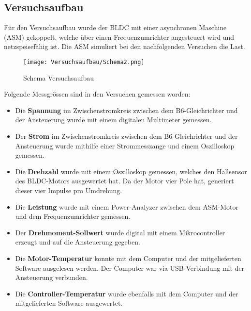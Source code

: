 \subsection{Versuchsaufbau}\label{subsec:Versuchsaufbau}
Für den Versuchsaufbau wurde der BLDC mit einer asynchronen Maschine (ASM) gekoppelt, welche über einen Frequenzumrichter angesteuert wird und netzspeisefähig ist. Die ASM simuliert bei den nachfolgenden Versuchen die Last.


\begin{figure}[H]
	\begin{center}
		\texttt{[image: Versuchsaufbau/Schema2.png]}
		\caption{Schema Versuchsaufbau}
		\label{fig:Schema}
	\end{center}
\end{figure}

Folgende Messgrössen sind in den Versuchen gemessen worden:
\begin{itemize}
	\item Die \textbf{Spannung} im Zwischenstromkreis zwischen dem B6-Gleichrichter und der Ansteuerung wurde mit einem digitalen Multimeter gemessen.
	\item Der \textbf{Strom} im Zwischenstromkreis zwischen dem B6-Gleichrichter und der Ansteuerung wurde mithilfe einer Strommesszange und einem Oszilloskop gemessen.
	\item Die \textbf{Drehzahl} wurde mit einem Oszilloskop gemessen, welches den Hallsensor des BLDC-Motors ausgewertet hat. Da der Motor vier Pole hat, generiert dieser vier Impulse pro Umdrehung.
	\item Die \textbf{Leistung} wurde mit einem Power-Analyzer zwischen dem ASM-Motor und dem Frequenzumrichter gemessen.
	\item Der \textbf{Drehmoment-Sollwert} wurde digital mit einem Mikrocontroller erzeugt und auf die Ansteuerung gegeben.
	\item Die \textbf{Motor-Temperatur} konnte mit dem Computer und der mitgelieferten Software ausgelesen werden. Der Computer war via USB-Verbindung mit der Ansteuerung verbunden.
	\item Die \textbf{Controller-Temperatur} wurde ebenfalls mit dem Computer und der mitgelieferten Software ausgewertet.
\end{itemize}

